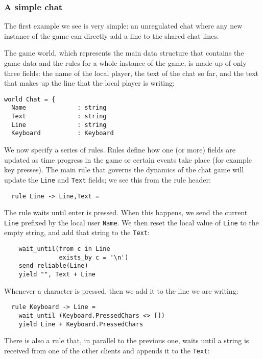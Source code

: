 \subsubsection{A simple chat}
The first example we see is very simple: an unregulated chat where any new instance of the game can directly add a line to the shared chat lines.

The game world, which represents the main data structure that contains the game data and the rules for a whole instance of the game, is made up of only three fields: the name of the local player, the text of the chat so far, and the text that makes up the line that the local player is writing:

\begin{lstlisting}
world Chat = {
  Name              : string
  Text              : string
  Line              : string
  Keyboard          : Keyboard
\end{lstlisting}

We now specify a series of rules. Rules define how one (or more) fields are updated as time progress in the game or certain events take place (for example key presses). The main rule that governs the dynamics of the chat game will update the \texttt{Line} and \texttt{Text} fields; we see this from the rule header:

\begin{lstlisting}
  rule Line -> Line,Text =
\end{lstlisting}

The rule waits until enter is pressed. When this happens, we send the current \texttt{Line} prefixed by the local user \texttt{Name}. We then reset the local value of \texttt{Line} to the empty string, and add that string to the \texttt{Text}:

\begin{lstlisting}
    wait_until(from c in Line
               exists_by c = '\n')
    send_reliable(Line)
    yield "", Text + Line
\end{lstlisting}

Whenever a character is pressed, then we add it to the line we are writing:

\begin{lstlisting}
  rule Keyboard -> Line =
    wait_until (Keyboard.PressedChars <> [])
    yield Line + Keyboard.PressedChars
\end{lstlisting}

There is also a rule that, in parallel to the previous one, waits until a string is received from one of the other clients and appends it to the \texttt{Text}:

